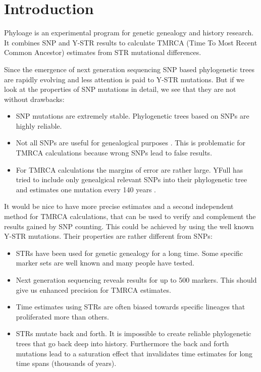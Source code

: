 \section{Introduction}

Phyloage is an experimental program for genetic genealogy
and history research. It combines SNP and Y-STR results to
calculate TMRCA (Time To Most Recent Common Ancestor)
estimates from STR mutational differences.

Since the emergence of next generation sequencing SNP based
phylogenetic trees are rapidly evolving and less attention
is paid to Y-STR mutations. But if we look at the properties
of SNP mutations in detail, we see that they are not without
drawbacks:

\begin{itemize}
\item SNP mutations are extremely stable. Phylogenetic trees
	based on SNPs are highly reliable.
\item Not all SNPs are useful for genealogical purposes
	\cite{YFullMutationRate}. This is problematic for TMRCA
	calculations because wrong SNPs lead to false results.
\item For TMRCA calculations the margins of error are rather large.
	YFull has tried to include only genealgical relevant SNPs
	into their phylogenetic tree \cite{YFullTree} and estimates
	one mutation every 140 years \cite{YFullMutationRate}.
\end{itemize}

It would be nice to have more precise estimates and a second
independent method for TMRCA calculations, that can be used to
verify and complement the results gained by SNP counting.
This could be achieved by using the well known Y-STR mutations.
Their properties are rather different from SNPs:

\begin{itemize}
\item STRs have been used for genetic genealogy for a long
	time. Some specific marker sets are well known and many
	people have tested.
\item Next generation sequencing reveals results for up to
	500 markers. This should give us enhanced precision for
	TMRCA estimates.
\item Time estimates using STRs are often biased towards
	specific lineages that proliferated more than others.
\item STRs mutate back and forth. It is impossible to create
	reliable phylogenetic trees that go back deep into
	history. Furthermore the back and forth mutations lead
	to a saturation effect that invalidates time estimates
	for long time spans (thousands of years).
\end{itemize}

